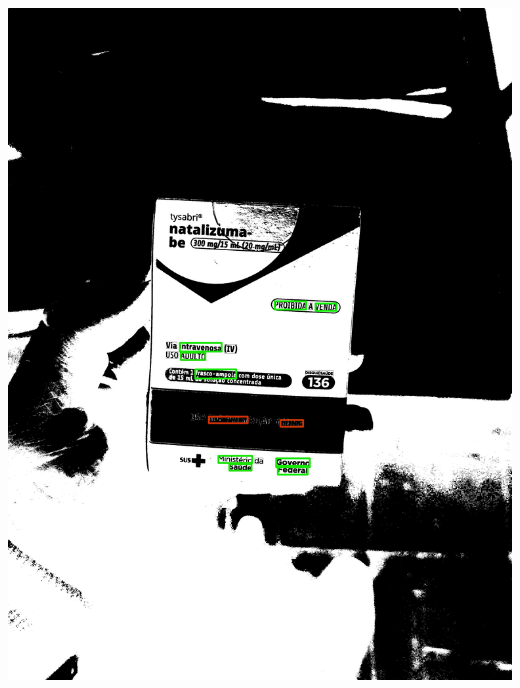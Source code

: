 \begin{frame}
\begin{columns}
\begin{column}{0.24\textwidth}
			\includegraphics[height=0.35\textheight]{../pictures/tysabri_cmyk_k_only_thresh_boxes.jpg}
		\end{column}
	\end{columns}
\end{frame}

